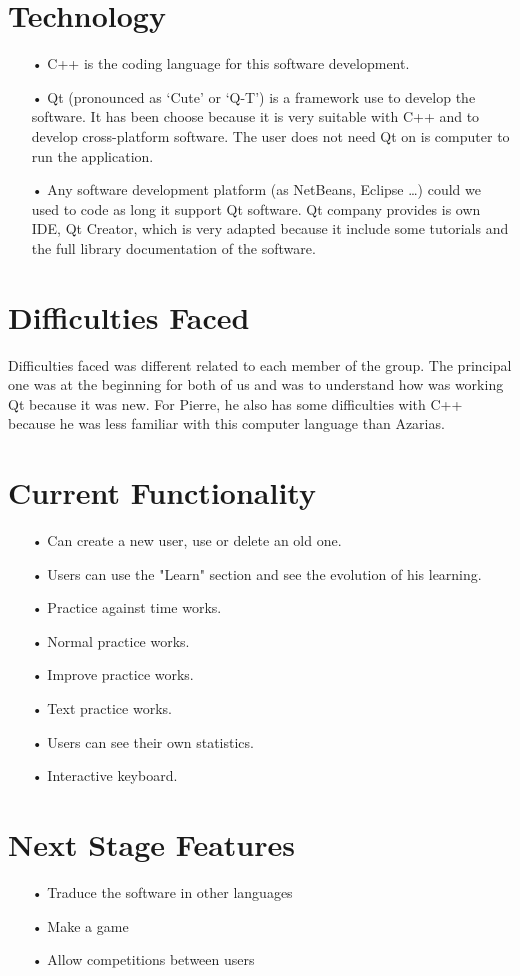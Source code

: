 \section{Technology}
\begin{itemize}
\item[•] C++ is the coding language for this software development.
\item[•] Qt (pronounced as ‘Cute’ or ‘Q-T’) is a framework use to develop the software. It has been choose because it is very suitable with C++ and to develop cross-platform software. The user does not need Qt on is computer to run the application. 
\item[•] Any software development platform (as NetBeans, Eclipse …) could we used to code as long it support Qt software. Qt company provides is own IDE, Qt Creator, which is very adapted because it include some tutorials and the full library documentation of the software. 
\end{itemize}

\section{Difficulties Faced}
Difficulties faced was different related to each member of the group. The principal one was at the beginning for both of us and was to understand how was working Qt because it was new. For Pierre, he also has some difficulties with C++ because he was less familiar with this computer language than Azarias. 

\section{Current Functionality}
\begin{itemize}
\item[•] Can create a new user, use or delete an old one.
\item[•] Users can use the "Learn" section and see the evolution of his learning.
\item[•] Practice against time works.
\item[•] Normal practice works.
\item[•] Improve practice works.
\item[•] Text practice works.
\item[•] Users can see their own statistics.
\item[•] Interactive keyboard.
\end{itemize}

\section{Next Stage Features}
\begin{itemize}
\item[•] Traduce the software in other languages
\item[•] Make a game
\item[•] Allow competitions between users
\end{itemize}

